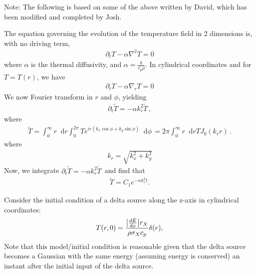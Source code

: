 \documentclass{article}
\newcommand*\diff{\mathop{}\!\mathrm{d}}
\newcommand*\f[2]{\frac{#1}{#2}}
\begin{document}
\pagebreak
Note: The following is based on some of the above written by David, which has been modified and completed by Josh.

The equation governing the evolution of the temperature field in 2 dimensions is, with no driving term,
\begin{align}
\partial_t T - \alpha\nabla^2 T = 0
\end{align}
where $\alpha$ is the thermal diffusivity, and $\alpha=\f{k}{c_p\rho}$. In cylindrical coordinates and for $T = T(r)$, we have
\begin{align}
\partial_t T - \alpha\nabla_r T = 0
\end{align}
We now Fourier transform in $r$ and $\phi$, yielding
\begin{align}
\partial_t\tilde T =-\alpha k_r^2 \tilde T\,,
\end{align}
where
\begin{align}
\tilde T =  \int_0^\infty r \diff r\int_{0}^{2\pi} T e^{i r(k_x\cos\phi +k_y\sin\phi)}\diff \phi\, = 2\pi \int_0^\infty r \diff r  T J_0(k_r r)\,.
\end{align}
where
\begin{align}
k_r = \sqrt{k_x^2 +k_y^2}
\end{align}
Now, we integrate $\partial_t\tilde T =-\alpha k_r^2 \tilde T\,$ and find that
\begin{align}
\tilde T = C_1e^{-\alpha k_r^2 t}.
\end{align}

Consider the initial condition of a delta source along the z-axis in cylindrical coordinates:
\begin{align}
T(r,0) = \f{\abs{\frac{dE}{dx}}r_X}{\rho \sigma_X c_p}\delta(r),
\end{align}
Note that this model/initial condition is reasonable given that the delta source becomes a Gaussian with the same energy (assuming energy is conserved) an instant after the initial input of the delta source.
\end{document}
